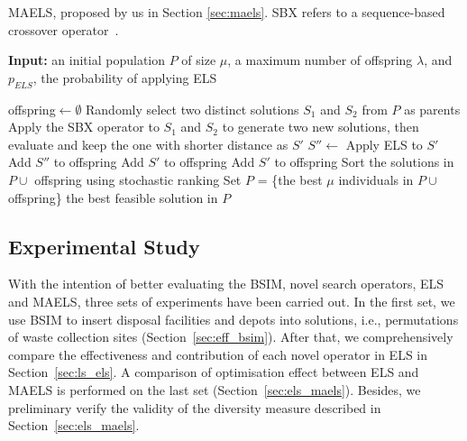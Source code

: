 \documentclass[journal]{IEEEtran}
\begin{document}
\begin{algorithm}[htbp]
	\caption{\label{algo:ma}MAELS, proposed by us in Section \ref{sec:maels}. SBX refers to a sequence-based crossover operator~\cite{potvin1996vehicle}.}
	{\bf Input:} an initial population $P$ of size $\mu$, a maximum number of offspring $\lambda$, and $p_{ELS}$, the probability of applying ELS
	\begin{algorithmic}[1]
		\State offspring$\leftarrow \emptyset$
		\State Randomly select two distinct solutions $S_1$ and $S_2$ from $P$ as parents
		\State Apply the SBX operator to $S_1$ and $S_2$ to generate two new solutions, then evaluate and keep the one with shorter distance as $S'$
		\State $S'' \leftarrow$ Apply ELS to $S'$
		\State Add $S''$ to offspring
		\State Add $S'$ to offspring
		\EndIf
		\State Add $S'$ to offspring
		\EndIf
		\EndFor
		\State Sort the solutions in $P \cup$ offspring using stochastic ranking \cite{runarsson2000stochastic}
		\State Set $P$ = \{the best $\mu$ individuals in $P \cup$ offspring\}
		\EndWhile
		\State\Return the best feasible solution in $P$
	\end{algorithmic}
\end{algorithm}


\subsection{Experimental Study}\label{sec:om_es}

With the intention of better evaluating the BSIM, novel search operators, ELS and MAELS, three sets of experiments have been carried out. In the first set, we use BSIM to insert disposal facilities and depots into solutions, i.e., permutations of waste collection sites (Section~\ref{sec:eff_bsim}). After that, we comprehensively compare the effectiveness and contribution of each novel operator in ELS in Section~\ref{sec:ls_els}. A comparison of optimisation effect between ELS and MAELS is performed on the last set (Section~\ref{sec:els_maels}). Besides, we preliminary verify the validity of the diversity measure described in Section~\ref{sec:els_maels}.
\end{document}
